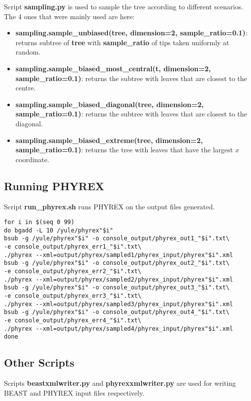 Script \textbf{sampling.py} is used to sample the tree according to different scenarios. The 4 ones that were mainly used are here:

\begin{itemize}
\item \textbf{sampling.sample\_unbiased(tree, dimension=2, sample\_ratio=0.1)}: returns subtree of \textbf{tree} with \textbf{sample\_ratio} of tips taken uniformly at random.

\item \textbf{sampling.sample\_biased\_most\_central(t, dimension=2, sample\_ratio=0.1)}: returns the subtree with leaves that are closest to the centre.

\item \textbf{sampling.sample\_biased\_diagonal(tree, dimension=2, sample\_ratio=0.1)}: returns the subtree with leaves that are closest to the diagonal.

\item \textbf{sampling.sample\_biased\_extreme(tree, dimension=2, sample\_ratio=0.1)}: returns the tree with leaves that have the largest $x$ coordinate.
\end{itemize}

\subsection*{Running PHYREX}

Script \textbf{run\_phyrex.sh} runs PHYREX on the output files generated.

\begin{verbatim}
for i in $(seq 0 99)
do bgadd -L 10 /yule/phyrex"$i"
bsub -g /yule/phyrex"$i" -o console_output/phyrex_out1_"$i".txt\
-e console_output/phyrex_err1_"$i".txt\
./phyrex --xml=output/phyrex/sampled1/phyrex_input/phyrex"$i".xml
bsub -g /yule/phyrex"$i" -o console_output/phyrex_out2_"$i".txt\
-e console_output/phyrex_err2_"$i".txt\
./phyrex --xml=output/phyrex/sampled2/phyrex_input/phyrex"$i".xml
bsub -g /yule/phyrex"$i" -o console_output/phyrex_out3_"$i".txt\
-e console_output/phyrex_err3_"$i".txt\
./phyrex --xml=output/phyrex/sampled3/phyrex_input/phyrex"$i".xml
bsub -g /yule/phyrex"$i" -o console_output/phyrex_out4_"$i".txt\
-e console_output/phyrex_err4_"$i".txt\
./phyrex --xml=output/phyrex/sampled4/phyrex_input/phyrex"$i".xml
done
\end{verbatim}

\subsection*{Other Scripts}
Scripts \textbf{beastxmlwriter.py} and \textbf{phyrexxmlwriter.py} are used for writing BEAST and PHYREX input files respectively.


